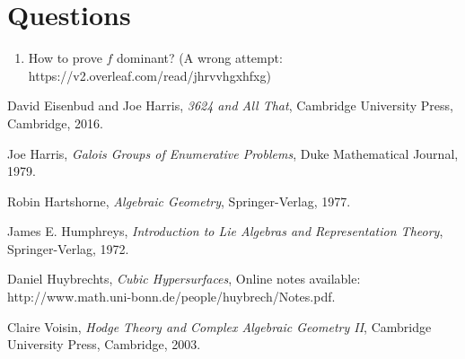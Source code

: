 \documentclass{article}
\begin{document}





 
\bigskip

\section{Questions}

\begin{enumerate}
\item How to prove $f$ dominant? (A wrong attempt: https://v2.overleaf.com/read/jhrvvhgxhfxg)
\end{enumerate}







\item \begin{thebibliography}{6}

David Eisenbud and Joe Harris,
\textit{3624 and All That},
Cambridge University Press, Cambridge, 2016.

Joe Harris,
\textit{Galois Groups of Enumerative Problems},
Duke Mathematical Journal, 1979.

Robin Hartshorne,
\textit{Algebraic Geometry},
Springer-Verlag, 1977.

James E. Humphreys,
\textit{Introduction to Lie Algebras and Representation Theory},
Springer-Verlag, 1972.

Daniel Huybrechts,
\textit{Cubic Hypersurfaces},
Online notes available: 
http://www.math.uni-bonn.de/people/huybrech/Notes.pdf.

Claire Voisin,
\textit{Hodge Theory and Complex Algebraic Geometry II},
Cambridge University Press, Cambridge, 2003.






\end{thebibliography}
\end{document}
